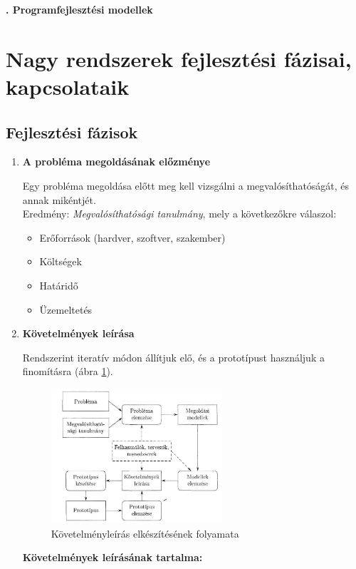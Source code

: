\documentclass[12pt,margin=0px]{article}
\begin{document}
    \thispagestyle{fancy}

    {\Large\bfseries{}. Programfejlesztési modellek} \\
	
	\section*{Nagy rendszerek fejlesztési fázisai, kapcsolataik}
	
	\subsection*{Fejlesztési fázisok}
		\begin{enumerate}
			\item \textbf{A probléma megoldásának előzménye}
			
			Egy probléma megoldása előtt meg kell vizsgálni a megvalósíthatóságát, és annak mikéntjét.\\

            \noindent Eredmény: \textit{Megvalósíthatósági tanulmány}, mely a következőkre válaszol:
			\begin{itemize}
				\item Erőforrások (hardver, szoftver, szakember)
				\item Költségek
				\item Határidő
				\item Üzemeltetés
			\end{itemize}
			\item \textbf{Követelmények leírása}
			
			\noindent Rendszerint iteratív módon állítjuk elő, és a prototípust használjuk a finomításra (ábra \ref{fig:kovetelmenyleiras}).
				
			\begin{figure}[H]
					\centering
					\includegraphics[width=0.6\textwidth]{img/kovetelmenyleiras.png}
					\caption{Követelményleírás elkészítésének folyamata}
					\label{fig:kovetelmenyleiras}
			\end{figure}
\newpage				
			\textbf{Követelmények leírásának tartalma:}
				

\end{enumerate}
\end{document}
